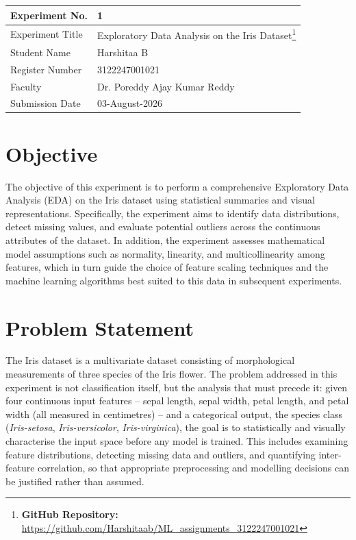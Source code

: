 \documentclass[12pt,a4paper]{article}
\begin{document}
\begin{tabular}{|p{4cm}|p{11cm}|}
\hline
Experiment No. & 1 \\ \hline
Experiment Title & Exploratory Data Analysis on the Iris Dataset\footnote{\textbf{GitHub Repository: }\url{https://github.com/Harshitaab/ML_assignments_3122247001021}}\\ \hline
Student Name & Harshitaa B\\ \hline
Register Number & 3122247001021 \\ \hline
Faculty & Dr. Poreddy Ajay Kumar Reddy \\ \hline
Submission Date & 03-August-2026\\ \hline
\end{tabular}

\section{Objective}
The objective of this experiment is to perform a comprehensive Exploratory Data Analysis (EDA) on the Iris dataset using statistical summaries and visual representations. Specifically, the experiment aims to identify data distributions, detect missing values, and evaluate potential outliers across the continuous attributes of the dataset. In addition, the experiment assesses mathematical model assumptions such as normality, linearity, and multicollinearity among features, which in turn guide the choice of feature scaling techniques and the machine learning algorithms best suited to this data in subsequent experiments.

\section{Problem Statement}
The Iris dataset is a multivariate dataset consisting of morphological measurements of three species of the Iris flower. The problem addressed in this experiment is not classification itself, but the analysis that must precede it: given four continuous input features -- sepal length, sepal width, petal length, and petal width (all measured in centimetres) -- and a categorical output, the species class (\textit{Iris-setosa}, \textit{Iris-versicolor}, \textit{Iris-virginica}), the goal is to statistically and visually characterise the input space before any model is trained. This includes examining feature distributions, detecting missing data and outliers, and quantifying inter-feature correlation, so that appropriate preprocessing and modelling decisions can be justified rather than assumed.
\end{document}
